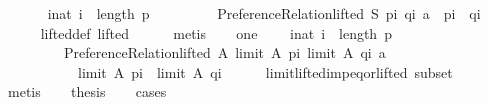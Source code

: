 \begin{isabellebody}
\ \ \isamarkupfalse%
\isanewline
\ \ \ \ {\isachardoublequoteopen}{\isasymforall}i{\isacharcolon}{\kern0pt}{\isacharcolon}{\kern0pt}nat{\isachardot}{\kern0pt}\ i\ {\isacharless}{\kern0pt}\ length\ p\ {\isasymlongrightarrow}\isanewline
\ \ \ \ \ \ \ \ {\isacharparenleft}{\kern0pt}Preference{\isacharunderscore}{\kern0pt}Relation{\isachardot}{\kern0pt}lifted\ S\ {\isacharparenleft}{\kern0pt}p{\isacharbang}{\kern0pt}i{\isacharparenright}{\kern0pt}\ {\isacharparenleft}{\kern0pt}q{\isacharbang}{\kern0pt}i{\isacharparenright}{\kern0pt}\ a\ {\isasymor}\ {\isacharparenleft}{\kern0pt}p{\isacharbang}{\kern0pt}i{\isacharparenright}{\kern0pt}\ {\isacharequal}{\kern0pt}\ {\isacharparenleft}{\kern0pt}q{\isacharbang}{\kern0pt}i{\isacharparenright}{\kern0pt}{\isacharparenright}{\kern0pt}{\isachardoublequoteclose}\isanewline
\ \ \ \ \isamarkupfalse%
\ lifted{\isacharunderscore}{\kern0pt}def\ lifted\isanewline
\ \ \ \ \isamarkupfalse%
\ metis\isanewline
\ \ \isamarkupfalse%
\ one{\isacharcolon}{\kern0pt}\isanewline
\ \ \ \ {\isachardoublequoteopen}{\isasymforall}i{\isacharcolon}{\kern0pt}{\isacharcolon}{\kern0pt}nat{\isachardot}{\kern0pt}\ i\ {\isacharless}{\kern0pt}\ length\ p\ {\isasymlongrightarrow}\isanewline
\ \ \ \ \ \ \ \ \ {\isacharparenleft}{\kern0pt}Preference{\isacharunderscore}{\kern0pt}Relation{\isachardot}{\kern0pt}lifted\ A\ {\isacharparenleft}{\kern0pt}limit\ A\ {\isacharparenleft}{\kern0pt}p{\isacharbang}{\kern0pt}i{\isacharparenright}{\kern0pt}{\isacharparenright}{\kern0pt}\ {\isacharparenleft}{\kern0pt}limit\ A\ {\isacharparenleft}{\kern0pt}q{\isacharbang}{\kern0pt}i{\isacharparenright}{\kern0pt}{\isacharparenright}{\kern0pt}\ a\ {\isasymor}\isanewline
\ \ \ \ \ \ \ \ \ \ \ {\isacharparenleft}{\kern0pt}limit\ A\ {\isacharparenleft}{\kern0pt}p{\isacharbang}{\kern0pt}i{\isacharparenright}{\kern0pt}{\isacharparenright}{\kern0pt}\ {\isacharequal}{\kern0pt}\ {\isacharparenleft}{\kern0pt}limit\ A\ {\isacharparenleft}{\kern0pt}q{\isacharbang}{\kern0pt}i{\isacharparenright}{\kern0pt}{\isacharparenright}{\kern0pt}{\isacharparenright}{\kern0pt}{\isachardoublequoteclose}\isanewline
\ \ \ \ \isamarkupfalse%
\ limit{\isacharunderscore}{\kern0pt}lifted{\isacharunderscore}{\kern0pt}imp{\isacharunderscore}{\kern0pt}eq{\isacharunderscore}{\kern0pt}or{\isacharunderscore}{\kern0pt}lifted\ subset\isanewline
\ \ \ \ \isamarkupfalse%
\ metis\isanewline
\ \ \isamarkupfalse%
\ {\isacharquery}{\kern0pt}thesis\isanewline
\ \ \isamarkupfalse%
\ cases\isanewline

\end{isabellebody}
